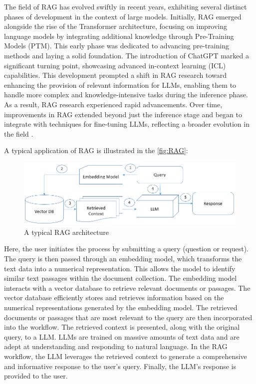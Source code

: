 The field of RAG has evolved swiftly in recent years, exhibiting several distinct phases of development in the context of large models. Initially, RAG emerged alongside the rise of the Transformer architecture, focusing on improving language models by integrating additional knowledge through Pre-Training Models (PTM). This early phase was dedicated to advancing pre-training methods and laying a solid foundation. The introduction of ChatGPT marked a significant turning point, showcasing advanced in-context learning (ICL) capabilities. This development prompted a shift in RAG research toward enhancing the provision of relevant information for LLMs, enabling them to handle more complex and knowledge-intensive tasks during the inference phase. As a result, RAG research experienced rapid advancements. Over time, improvements in RAG extended beyond just the inference stage and began to integrate with techniques for fine-tuning LLMs, reflecting a broader evolution in the field \cite{Gao.18Dec2023}.

A typical application of RAG is illustrated in the \autoref{fig:RAG}:
\begin{figure}[h!]
\centering
\includegraphics[width=1\textwidth]{Figures/RAG.png}
\caption{A typical RAG architecture}
\label{fig:RAG}
\end{figure}


Here, the user initiates the process by submitting a query (question or request). The query is then passed through an embedding model, which transforms the text data into a numerical representation. This allows the model to identify similar text passages within the document collection. The embedding model interacts with a vector database to retrieve relevant documents or passages. The vector database efficiently stores and retrieves information based on the numerical representations generated by the embedding model. The retrieved documents or passages that are most relevant to the query are then incorporated into the workflow. The retrieved context is presented, along with the original query, to a LLM. LLMs are trained on massive amounts of text data and are adept at understanding and responding to natural language. In the RAG workflow, the LLM leverages the retrieved context to generate a comprehensive and informative response to the user’s query. Finally, the LLM’s response is provided to the user.

